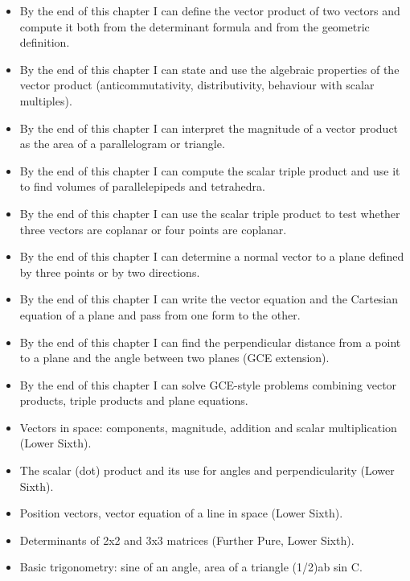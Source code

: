 \documentclass[11pt]{article}
\begin{document}
\begin{objectifs}
\begin{itemize}
\item By the end of this chapter I can define the vector product of two vectors and compute it both from the determinant formula and from the geometric definition.
\item By the end of this chapter I can state and use the algebraic properties of the vector product (anticommutativity, distributivity, behaviour with scalar multiples).
\item By the end of this chapter I can interpret the magnitude of a vector product as the area of a parallelogram or triangle.
\item By the end of this chapter I can compute the scalar triple product and use it to find volumes of parallelepipeds and tetrahedra.
\item By the end of this chapter I can use the scalar triple product to test whether three vectors are coplanar or four points are coplanar.
\item By the end of this chapter I can determine a normal vector to a plane defined by three points or by two directions.
\item By the end of this chapter I can write the vector equation and the Cartesian equation of a plane and pass from one form to the other.
\item By the end of this chapter I can find the perpendicular distance from a point to a plane and the angle between two planes (GCE extension).
\item By the end of this chapter I can solve GCE-style problems combining vector products, triple products and plane equations.
\end{itemize}
\end{objectifs}

\begin{prerequis}
\begin{itemize}
\item Vectors in space: components, magnitude, addition and scalar multiplication (Lower Sixth).
\item The scalar (dot) product and its use for angles and perpendicularity (Lower Sixth).
\item Position vectors, vector equation of a line in space (Lower Sixth).
\item Determinants of 2x2 and 3x3 matrices (Further Pure, Lower Sixth).
\item Basic trigonometry: sine of an angle, area of a triangle (1/2)ab sin C.
\end{itemize}
\end{prerequis}
\end{document}
